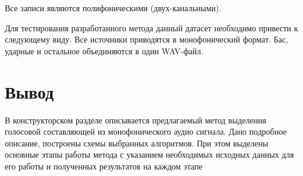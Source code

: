 Все записи являются полифоническими (двух-канальными).

Для тестирования разработанного метода данный датасет необходимо привести к следующему виду. Все источники приводятся в монофонический формат. Бас, ударные и остальное объединяются в один WAV-файл.

\section{Вывод}

В конструкторском разделе описывается предлагаемый метод выделения голосовой составляющей из монофонического аудио сигнала. Дано подробное описание, построены схемы выбранных алгоритмов. При этом выделены основные этапы работы метода с указанием необходимых исходных данных для его работы и полученных результатов на каждом этапе

